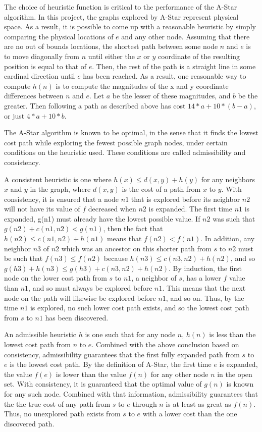 The choice of heuristic function is critical to the performance of the A-Star algorithm. In this project, the graphs explored by A-Star represent physical space. As a result, it is possible to come up with a reasonable heuristic by simply comparing the physical locations of $e$ and any other node. Assuming that there are no out of bounds locations, the shortest path between some node $n$ and $e$ is to move diagonally from $n$ until either the $x$ or $y$ coordinate of the resulting position is equal to that of $e$. Then, the rest of the path is a straight line in some cardinal direction until $e$ has been reached. As a result, one reasonable way to compute $h(n)$ is to compute the magnitudes of the x and y coordinate differences between $n$ and $e$. Let $a$ be the lesser of these magnitudes, and $b$ be the greater. Then following a path as described above has cost $14 * a + 10 * (b - a)$, or just $4 * a  + 10 * b$. 

The A-Star algorithm is known to be optimal, in the sense that it finds the lowest cost path while exploring the fewest possible graph nodes, under certain conditions on the heuristic used. These conditions are called admissibility and consistency.

A consistent heuristic is one where $h(x) \leq d(x,y) + h(y)$ for any neighbors $x$ and $y$ in the graph, where $d(x, y)$ is the cost of a path from $x$ to $y$. With consistency, it is ensured that a node $n1$ that is explored before its neighbor $n2$ will not have its value of $f$ decreased when $n2$ is expanded. The first time $n1$ is expanded, g(n1) must already have the lowest possible value. If $n2$ was such that $g(n2) + c(n1, n2) < g(n1)$, then the fact that $h(n2) \leq c(n1, n2) + h(n1)$ means that $f(n2) < f(n1)$. In addition, any neighbor $n3$ of $n2$ which was an ancestor on this shorter path from $s$ to $n2$ must be such that $f(n3) \leq f(n2)$ because $h(n3) \leq c(n3, n2) + h(n2)$, and so $g (h3) + h(n3) \leq g (h3) + c(n3, n2) + h(n2)$. By induction, the first node on the lower cost path from $s$ to $n1$, a neighbor of $s$, has a lower $f$ value than $n1$, and so must always be explored before $n1$. This means that the next node on the path will likewise be explored before $n1$, and so on. Thus, by the time $n1$ is explored, no such lower cost path exists, and so the lowest cost path from $s$ to $n1$ has been discovered. 

An admissible heuristic $h$ is one such that for any node $n$, $h(n)$ is less than the lowest cost path from $n$ to $e$. Combined with the above conclusion based on consistency, admissibility guarantees that the first fully expanded path from $s$ to $e$ is the lowest cost path. By the definition of A-Star, the first time $e$ is expanded, the value $f(e)$ is lower than the value $f(n)$ for any other node $n$ in the open set. With consistency, it is guaranteed that the optimal value of $g(n)$ is known for any such node. Combined with that information, admissibility guarantees that the the true cost of any path from $s$ to $e$ through $n$ is at least as great as $f(n)$. Thus, no unexplored path exists from $s$ to $e$ with a lower cost than the one discovered path.

